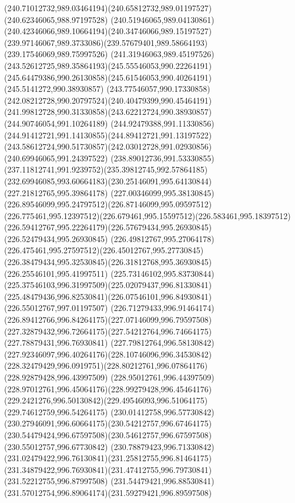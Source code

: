 {{  \curveto(240.71012732,989.03464194)(240.65812732,989.01197527)(240.62346065,988.97197528)
  \curveto(240.51946065,989.04130861)(240.42346066,989.10664194)(240.34746066,989.15197527)
  \curveto(239.97146067,989.3733086)(239.57679401,989.58664193)(239.17546069,989.75997526)
  \curveto(241.31946063,989.45197526)(243.52612725,989.35864193)(245.55546053,990.22264191)
  \curveto(245.64479386,990.26130858)(245.61546053,990.40264191)(245.5141272,990.38930857)
  \curveto(243.77546057,990.17330858)(242.08212728,990.20797524)(240.40479399,990.45464191)
  \curveto(241.99812728,990.31330858)(243.62212724,990.38930857)(244.90746054,991.10264189)
  \curveto(244.92479388,991.11330856)(244.91412721,991.14130855)(244.89412721,991.13197522)
  \curveto(243.58612724,990.51730857)(242.03012728,991.02930856)(240.69946065,991.24397522)
  \curveto(238.89012736,991.53330855)(237.11812741,991.9239752)(235.39812745,992.57864185)
  \curveto(232.69946085,993.60664183)(230.25146091,995.64130844)(227.21812765,995.39864178)
  \curveto(227.00346099,995.38130845)(226.89546099,995.24797512)(226.87146099,995.09597512)
  \curveto(226.775461,995.12397512)(226.679461,995.15597512)(226.583461,995.18397512)
  \curveto(226.59412767,995.22264179)(226.57679434,995.26930845)(226.52479434,995.26930845)
  \curveto(226.49812767,995.27064178)(226.475461,995.27597512)(226.45012767,995.27730845)
  \curveto(226.38479434,995.32530845)(226.31812768,995.36930845)(226.25546101,995.41997511)
  \curveto(225.73146102,995.83730844)(225.37546103,996.31997509)(225.02079437,996.81330841)
  \curveto(225.48479436,996.82530841)(226.07546101,996.84930841)(226.55012767,997.01197507)
  \curveto(226.71279433,996.91464174)(226.89412766,996.84264175)(227.07146099,996.79597508)
  \curveto(227.32879432,996.72664175)(227.54212764,996.74664175)(227.78879431,996.76930841)
  \curveto(227.79812764,996.58130842)(227.92346097,996.40264176)(228.10746096,996.34530842)
  \curveto(228.32479429,996.0919751)(228.80212761,996.07864176)(228.92879428,996.43997509)
  \curveto(228.95012761,996.44397509)(228.97012761,996.45064176)(228.99279428,996.45464176)
  \curveto(229.2421276,996.50130842)(229.49546093,996.51064175)(229.74612759,996.54264175)
  \curveto(230.01412758,996.57730842)(230.27946091,996.60664175)(230.54212757,996.67464175)
  \curveto(230.54479424,996.67597508)(230.54612757,996.67597508)(230.55012757,996.67730842)
  \curveto(230.78879423,996.71330842)(231.02479422,996.76130841)(231.25812755,996.81464175)
  \curveto(231.34879422,996.76930841)(231.47412755,996.79730841)(231.52212755,996.87997508)
  \curveto(231.54479421,996.88530841)(231.57012754,996.89064174)(231.59279421,996.89597508)
}}
